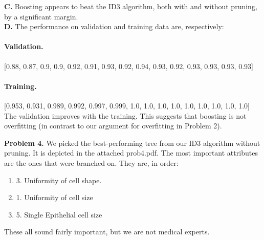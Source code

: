 \documentclass[12pt]{amsart}
\theoremstyle{remark}
\begin{document}
\textbf{C.} Boosting appears to beat the ID3 algorithm, both with and without pruning, by a significant margin. \\

\textbf{D.} The performance on validation and training data are, respectively:\\

\paragraph{Validation.}  [0.88, 0.87, 0.9, 0.9, 0.92, 0.91, 0.93, 0.92, 0.94, 0.93, 0.92, 0.93, 0.93, 0.93, 0.93]\\
 

\paragraph{Training.} [0.953, 0.931, 0.989, 0.992, 0.997, 0.999, 1.0, 1.0, 1.0, 1.0, 1.0, 1.0, 1.0, 1.0, 1.0] \\

The validation improves with the training. This suggests that boosting is not overfitting (in contrast to our argument for overfitting in Problem 2). 

\newpage

\noindent \textbf{Problem 4.} We picked the best-performing tree from our ID3 algorithm without pruning. It is depicted in the attached prob4.pdf. The most important attributes are the ones that were branched on. They are, in order:
\begin{enumerate}
\item 3. Uniformity of cell shape. 
\item 1. Uniformity of cell size
\item 5. Single Epithelial cell size
\end{enumerate}
These all sound fairly important, but we are not medical experts. 
\end{document}
